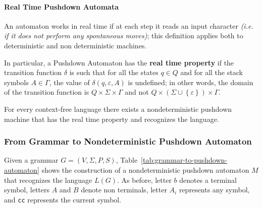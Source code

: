 \documentclass[english]{article}
\begin{document}
\paragraph{Real Time Pushdown Automata}

An automaton works in real time if at each step it reads an input character \textit{(i.e. if it does not perform any spontaneous moves)};
this definition applies both to deterministic and non deterministic machines.

In particular, a Pushdown Automaton has the \textbf{real time property} if the transition function \(\delta\) is such that for all the states \(q \in Q\) and for all the stack symbols \(A \in \Gamma\), the value of \(\delta(q, \varepsilon, A)\) is undefined;
in other words, the domain of the transition function is \(Q \times \Sigma \times \Gamma\) and not \(Q \times \left( \Sigma \cup \left\{ \varepsilon \right\} \right) \times \Gamma\).

For every context-free language there exists a nondeterministic pushdown machine that has the real time property and recognizes the language.

\subsubsection{From Grammar to Nondeterministic Pushdown Automaton}

Given a grammar \(G = \left( V, \Sigma, P, S \right)\), Table~\ref{tab:grammar-to-pushdown-automaton} shows the construction of a nondeterministic pushdown automaton \(M\) that recognizes the language \(L(G)\).
As before, letter \(b\) denotes a terminal symbol, letters \(A\) and \(B\) denote non terminals, letter \(A_i\) represents any symbol, and \texttt{cc} represents the current symbol.
\end{document}
